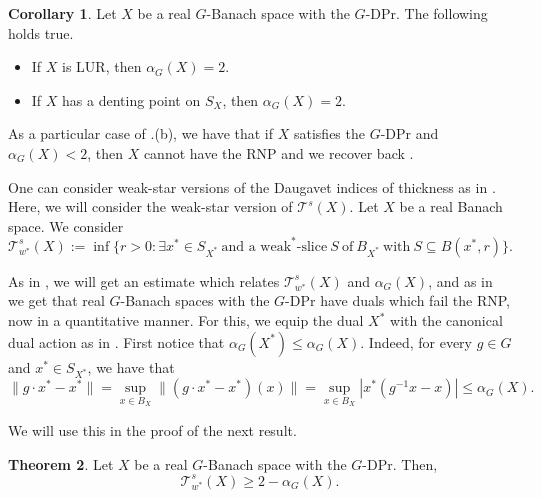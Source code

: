 \documentclass[a4paper,12pt]{amsart}
\theoremstyle{definition}
\newtheorem{theorem}{Theorem}[section]
\newtheorem{corollary}[theorem]{Corollary}
\theoremstyle{definition}
\theoremstyle{remark}
\numberwithin{equation}{section}
\renewcommand{\geq}{\geqslant}
\renewcommand{\leq}{\leqslant}
\newcommand{\<}{\langle}
\renewcommand{\>}{\rangle}
\begin{document}
	\begin{corollary} \label{corollary-LUR-denting} Let $X$ be a real $G$-Banach space with the $G$-DPr. The following holds true.
		\begin{itemize}
			\item[(a)] If $X$ is LUR, then $\alpha_G(X) = 2$.
			\item[(b)] If $X$ has a denting point on $S_X$, then $\alpha_G(X) = 2$.
		\end{itemize}
	\end{corollary}
	
	
	
	As a particular case of .(b), we have that if $X$ satisfies the $G$-DPr and $\alpha_G(X) < 2$, then $X$ cannot have the RNP and we recover back .
	
	
	
	One can consider weak-star versions of the Daugavet indices of thickness as in \cite[Section 3]{HallerLangemetsLimaNadelRuedaZoca2021}. Here, we will consider the weak-star version of $\mathcal{T}^s(X)$. Let $X$ be a real Banach space. We consider 
	\begin{equation*}
		\mathcal{T}_{w^*}^s(X) := \inf \{ r>0: \exists x^* \in S_{X^*} \ \mbox{and a weak}^*\mbox{-slice} \ S \ \mbox{of} \ B_{X^*} \ \mbox{with} \ S \subseteq B(x^*, r) \}.
	\end{equation*}
	
	
	As in , we will get an estimate which relates $\mathcal{T}_{w^*}^s(X)$ and $\alpha_G(X)$, and as in  we get that real $G$-Banach spaces with the $G$-DPr have duals which fail the RNP, now in a quantitative manner. For this, we equip the dual $X^*$ with the canonical dual action as in . First notice that $\alpha_G(X^*) \leq \alpha_G(X)$. Indeed, for every $g \in G$ and $x^* \in S_{X^*}$, we have that 
	\begin{equation*}
		\|g \cdot x^* - x^*\| = \sup_{x \in B_X} \|(g \cdot x^* - x^*)(x) \| = \sup_{x \in B_X} |x^*(g^{-1}x - x)| \leq \alpha_G(X).
	\end{equation*}
	
	We will use this in the proof of the next result.
	
	\begin{theorem} \label{theorem:relation-between-alphaG-dual} Let $X$ be a real $G$-Banach space with the $G$-DPr. Then,
		\begin{equation} \label{estimate-alphaG-dual}
			\mathcal{T}_{w^*}^s(X) \geq 2 - \alpha_G(X).
		\end{equation}
	\end{theorem}
	
\end{document}
